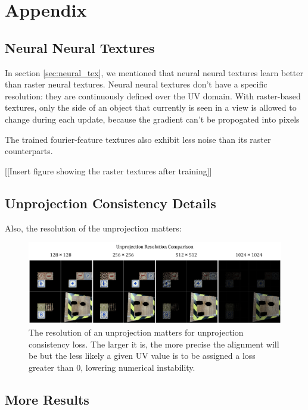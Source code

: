 \section{Appendix} 

\subsection{Neural Neural Textures}

	In section \ref{sec:neural_tex}, we mentioned that neural neural textures learn better than raster neural textures. 
	Neural neural textures don't have a specific resolution: they are continuously defined over the UV domain.
	With raster-based textures, only the side of an object that currently is seen in a view is allowed to change during each update, because the gradient can't be propogated into pixels 

	The trained fourier-feature textures also exhibit less noise than its raster counterparts. 

	[[Insert figure showing the raster textures after training]]


\subsection{Unprojection Consistency Details}

	Also, the resolution of the unprojection matters:

	\begin{figure}[H]
		\begin{center}
			\includegraphics[width=400pt]{../images/unprojection_resolution_comparison.pdf}
		\end{center}
		\caption{
			The resolution of an unprojection matters for unprojection consistency loss. The larger it is, the more precise the alignment will be but the less likely a given UV value is to be assigned a loss greater than 0, lowering numerical instability.
		}
		\label{fig:unprojection_resolution_comparison}
	\end{figure}
	
\subsection{More Results}